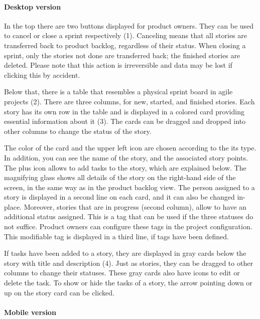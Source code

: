 \documentclass[
	accentcolor=tud1a %
]{tudreport}
\begin{document}
\paragraph{Desktop version}
In the top there are two buttons displayed for product owners. They can be used to cancel or close a sprint respectively (1). Canceling means that all stories are transferred back to product backlog, regardless of their status. When closing a sprint, only the stories not done are transferred back; the finished stories are deleted. Please note that this action is irreversible and data may be lost if clicking this by accident.

Below that, there is a table that resembles a physical sprint board in agile projects (2). There are three columns, for new, started, and finished stories. Each story has its own row in the table and is displayed in a colored card providing essential information about it (3). The cards can be dragged and dropped into other columns to change the status of the story.

The color of the card and the upper left icon are chosen according to the its type. In addition, you can see the name of the story, and the associated story points. The plus icon allows to add tasks to the story, which are explained below. The magnifying glass shows all details of the story on the right-hand side of the screen, in the same way as in the product backlog view. The person assigned to a story is displayed in a second line on each card, and it can also be changed in-place. Moreover, stories that are in progress (second column), allow to have an additional status assigned. This is a tag that can be used if the three statuses do not suffice. Product owners can configure these tags in the project configuration. This modifiable tag is displayed in a third line, if tags have been defined.

If tasks have been added to a story, they are displayed in gray cards below the story with title and description (4). Just as stories, they can be dragged to other columns to change their statuses. These gray cards also have icons to edit or delete the task. To show or hide the tasks of a story, the arrow pointing down or up on the story card can be clicked.

\paragraph{Mobile version}
\end{document}
